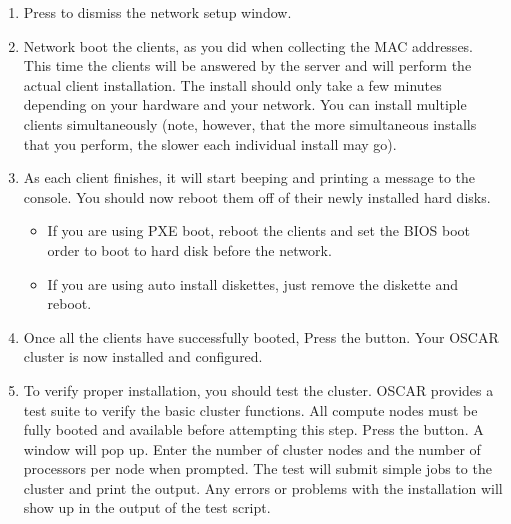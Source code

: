 \begin {enumerate}

\item Press  to dismiss the network setup window.
  
\item Network boot the clients, as you did when collecting the MAC
  addresses. This time the clients will be answered by the server and
  will perform the actual client installation. The install should only
  take a few minutes depending on your hardware and your network.  You
  can install multiple clients simultaneously (note, however, that the
  more simultaneous installs that you perform, the slower each
  individual install may go).

  
\item As each client finishes, it will start beeping and printing a
  message to the console. You should now reboot them off of their
  newly installed hard disks.

  \begin{itemize}
  \item If you are using PXE boot, reboot the clients and set the BIOS
    boot order to boot to hard disk before the network.
  \item If you are using auto install diskettes, just remove the
    diskette and reboot.
  \end{itemize}

  
\item Once all the clients have successfully booted, Press the
   button. Your OSCAR cluster is now
  installed and configured.

  
\item To verify proper installation, you should test the cluster.
  OSCAR provides a test suite to verify the basic cluster functions.
  All compute nodes must be fully booted and available before
  attempting this step.  Press the  button.
  A window will pop up.  Enter the number of cluster nodes and the
  number of processors per node when prompted. The test will submit
  simple jobs to the cluster and print the output. Any errors or
  problems with the installation will show up in the output of the
  test script.


\end{enumerate}

